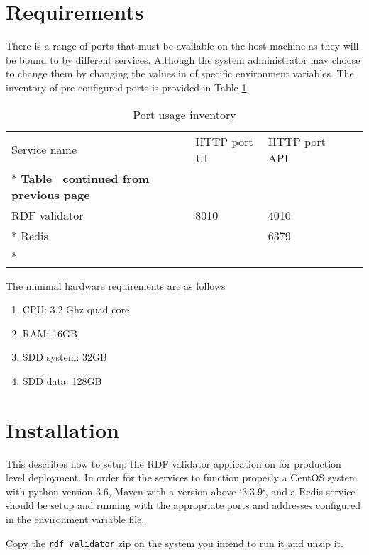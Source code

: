 \section{Requirements}
\label{sec:requirements}
There is a range of ports that must be available on the host machine as they will be bound to by different services. Although the system administrator may choose to change them by changing the values in of specific environment variables. The inventory of pre-configured ports is provided in Table \ref{tab:validator-port-inventory}.

\begin{longtable}[c]{@{}p{3.64cm}p{1.25cm}p{1.25cm}p{1.9cm}p{5cm}@{}}
	\toprule
	Service name  & HTTP port UI & HTTP port API                \\* \midrule
	\endfirsthead
	\multicolumn{5}{c}%
	{{\bfseries Table \thetable\ continued from previous page}} \\
	\endhead
	\bottomrule
	\endfoot
	\endlastfoot
	RDF validator & 8010         & 4010                         \\* \hline
	Redis         &              & 6379                         \\* \bottomrule
	\caption{Port usage inventory}
	\label{tab:validator-port-inventory}                        \\
\end{longtable}

The minimal hardware requirements are as follows 
\begin{enumerate}
	\item CPU: 3.2 Ghz quad core
	\item RAM: 16GB
	\item SDD system: 32GB
	\item SDD data: 128GB
\end{enumerate}

\section{Installation}
\label{sec:installation}
This describes how to setup the RDF validator application on for production level deployment.
In order for the services to function properly a CentOS system with python version 3.6, Maven with a version above `3.3.9`, and a Redis service should be setup and running with the appropriate ports and addresses configured in the environment variable file. 

Copy the \texttt{rdf validator} zip on the system you intend to run it and unzip it.

